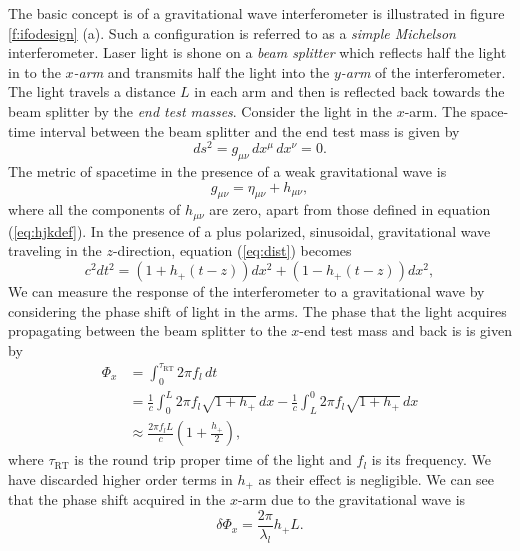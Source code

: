 The basic concept is of a gravitational wave interferometer is illustrated in
figure \ref{f:ifodesign} (a). Such a configuration is referred to as a
\emph{simple Michelson} interferometer. Laser light is shone on a \emph{beam
splitter} which reflects half the light in to the \emph{$x$-arm} and transmits
half the light into the \emph{$y$-arm} of the interferometer. The light
travels a distance $L$ in each arm and then is reflected back towards the beam
splitter by the \emph{end test masses}. Consider the light in the $x$-arm. The
space-time interval between the beam splitter and the end test mass is given
by
\begin{equation}
ds^2 = g_{\mu\nu}\, dx^\mu\, dx^\nu = 0.
\label{eq:dist}
\end{equation}
The metric of spacetime in the presence of a weak gravitational wave is
\begin{equation}
g_{\mu\nu} = \eta_{\mu\nu} + h_{\mu\nu},
\end{equation}
where all the components of $h_{\mu\nu}$ are zero, apart from those defined
in equation (\ref{eq:hjkdef}). In the presence of a plus polarized,
sinusoidal, gravitational wave traveling in the $z$-direction, equation
(\ref{eq:dist}) becomes
\begin{equation}
c^2 dt^2 = \left(1 + h_{+}(t-z)\right) dx^2 + \left(1 - h_{+}(t-z)\right) dx^2,
\end{equation}
We can measure the response of the interferometer to a gravitational wave by
considering the phase shift of light in the arms. The phase that the light
acquires propagating between the beam splitter to the $x$-end test mass and
back is is given by\cite{Saulson:1994}
\begin{equation}
\begin{split}
\Phi_x &= \int_0^{\tau_\mathrm{RT}} 2\pi f_l\, dt \\
&= \frac{1}{c} \int_0^L 2\pi f_l \sqrt{1 + h_{+}}\,dx -
\frac{1}{c} \int_L^0 2\pi f_l \sqrt{1 + h_{+}}\,dx \\
&\approx \frac{2\pi f_l L}{c} \left(1 + \frac{h_{+}}{2}\right),
\end{split}
\end{equation}
where $\tau_\mathrm{RT}$ is the round trip proper time of the light and $f_l$ is
its frequency. We have discarded higher order terms in $h_+$ as their effect
is negligible.  We can see that the phase shift acquired in the $x$-arm due to the
gravitational wave is
\begin{equation}
\delta \Phi_x = \frac{2\pi}{\lambda_l} h_{+} L.
\end{equation}
